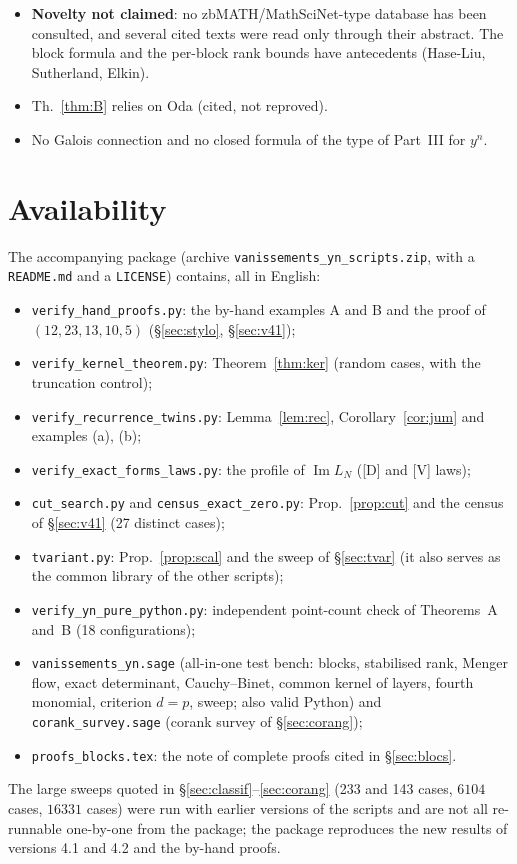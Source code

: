 \documentclass[11pt,a4paper]{article}
\begin{document}
\begin{itemize}
mechanism; the older tallies ($14$ zero minors, $7$ cancellations) and the census
$p\le31$, $g_0\le12$ have different domains; the claim that
$\det\Phi(\sigma,1)\equiv0$ over $\mathbb Z$ implies the same for
$\det\Phi(\sigma,t)$ by a weight argument is withdrawn (\S\ref{sec:tvar}).
\item \textbf{Novelty not claimed}: no zbMATH/MathSciNet-type database has been
consulted, and several cited texts were read only through their abstract. The
block formula and the per-block rank bounds have antecedents (Hase-Liu,
Sutherland, Elkin).
\item Th.~\ref{thm:B} relies on Oda (cited, not reproved).
\item No Galois connection and no closed formula of the type of Part~III for
$y^n$.
\end{itemize}

\section{Availability}
\label{sec:avail}

The accompanying package (archive \texttt{vanissements\_yn\_scripts.zip}, with a \texttt{README.md}
and a \texttt{LICENSE}) contains, all in English:
\begin{itemize}
\item \texttt{verify\_hand\_proofs.py}: the by-hand examples A and B and the proof of
$(12,23,13,10,5)$ (\S\ref{sec:stylo}, \S\ref{sec:v41});
\item \texttt{verify\_kernel\_theorem.py}: Theorem~\ref{thm:ker} (random cases, with the truncation control);
\item \texttt{verify\_recurrence\_twins.py}: Lemma~\ref{lem:rec}, Corollary~\ref{cor:jum} and examples (a), (b);
\item \texttt{verify\_exact\_forms\_laws.py}: the profile of $\operatorname{Im}L_N$ ([D] and [V] laws);
\item \texttt{cut\_search.py} and \texttt{census\_exact\_zero.py}: Prop.~\ref{prop:cut} and the census of
\S\ref{sec:v41} (27 distinct cases);
\item \texttt{tvariant.py}: Prop.~\ref{prop:scal} and the sweep of \S\ref{sec:tvar} (it also serves as the
common library of the other scripts);
\item \texttt{verify\_yn\_pure\_python.py}: independent point-count check of Theorems~A and~B (18 configurations);
\item \texttt{vanissements\_yn.sage} (all-in-one test bench: blocks, stabilised rank, Menger flow,
exact determinant, Cauchy--Binet, common kernel of layers, fourth monomial, criterion $d=p$, sweep; also valid
Python) and \texttt{corank\_survey.sage} (corank survey of \S\ref{sec:corang});
\item \texttt{proofs\_blocks.tex}: the note of complete proofs cited in \S\ref{sec:blocs}.
\end{itemize}
The large sweeps quoted in \S\ref{sec:classif}--\ref{sec:corang} (233 and 143 cases, $6104$ cases, $16331$
cases) were run with earlier versions of the scripts and are not all re-runnable one-by-one from the package;
the package reproduces the new results of versions 4.1 and 4.2 and the by-hand proofs.
\end{document}
